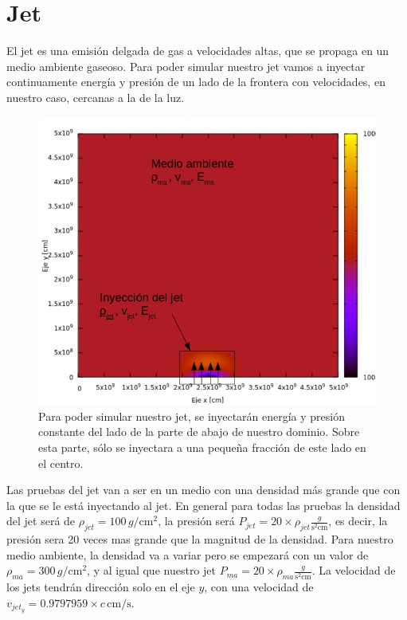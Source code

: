 \documentclass[12pt,a4paper]{book}
\begin{document}
\section{Jet}

El jet  es una emisión delgada de gas a velocidades altas, que se propaga en un medio ambiente gaseoso. Para poder simular nuestro jet vamos a inyectar continuamente energía y presión de un lado de la frontera con velocidades, en nuestro caso, cercanas a la de la luz.

\begin{figure}[H]
\centering
\includegraphics[scale=0.45]{./Figuras/Pruebas/Prueba_jet/jet_ejemplo}
\caption{Para poder simular nuestro jet, se inyectarán energía y presión constante del lado de la parte de abajo de nuestro dominio. Sobre esta parte, sólo se inyectara a una pequeña fracción de este lado en el centro.}
\end{figure}

Las pruebas del jet van a ser en un medio con una densidad más grande que con la que se le está inyectando al jet. En general para todas las pruebas la densidad del jet será de $\rho_{jet}  = 100 \, g/\mathrm{cm}^2$, la presión será $P_{jet} = 20 \times \rho_{jet} \frac{g}{\mathrm{s^2} \mathrm{cm}}$, es decir, la presión sera 20 veces mas grande que la magnitud de la densidad. Para nuestro medio ambiente, la densidad va a variar pero se empezará con un valor de $\rho_{ma}  = 300 \, g/\mathrm{cm}^2$, y al igual que nuestro jet $P_{ma} = 20 \times \rho_{ma} \frac{g}{\mathrm{s^2} \mathrm{cm}}$. La velocidad de los jets tendrán dirección solo en el eje $y$, con una velocidad de $v_{jet_{y}} = 0.9797959 \times c \, \mathrm{cm}/ \mathrm{s}$.
\end{document}
